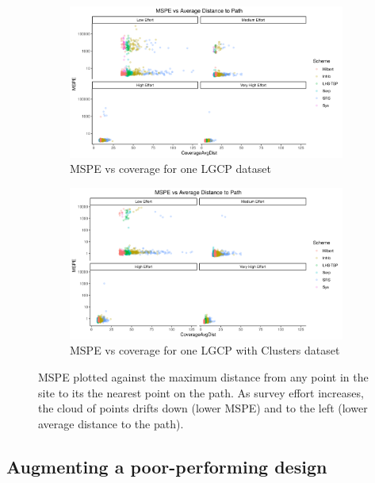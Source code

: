 \documentclass[review]{elsarticle}
\begin{document}
\begin{figure}

\begin{subfigure}{4.5in}
\includegraphics[width=4.5in]{../graphics/MSPE-Coverage-LGCP000004.png}
\caption{MSPE vs coverage for one LGCP dataset}
\label{covglgcp}
\end{subfigure}

\begin{subfigure}{4.5in}
\includegraphics[width=4.5in]{../graphics/MSPE-Coverage-Cluster000004.png}
\caption{MSPE vs coverage for one LGCP with Clusters dataset}
\label{covgclust}
\end{subfigure}

\caption{MSPE plotted against the maximum distance from any point in the site
to its the nearest point on the path. As survey effort increases, the cloud of
points drifts down (lower MSPE) and to the left (lower average distance to the
path).}
\label{covg}
\end{figure}



\subsection{Augmenting a poor-performing design}
\end{document}

